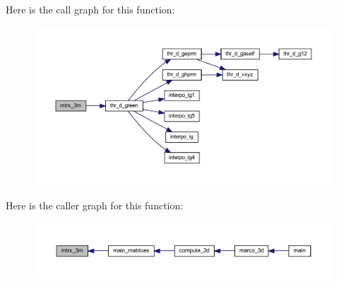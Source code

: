 Here is the call graph for this function\+:
\nopagebreak
\begin{figure}[H]
\begin{center}
\leavevmode
\includegraphics[width=350pt]{Marco_8f90_a9ccd53c7c6196e0d50a6db7a06d1c4e5_cgraph}
\end{center}
\end{figure}
Here is the caller graph for this function\+:
\nopagebreak
\begin{figure}[H]
\begin{center}
\leavevmode
\includegraphics[width=350pt]{Marco_8f90_a9ccd53c7c6196e0d50a6db7a06d1c4e5_icgraph}
\end{center}
\end{figure}
\mbox{\label{Marco_8f90_ae8f6d0ec346f13094a0e373aab8dd10d}} 
